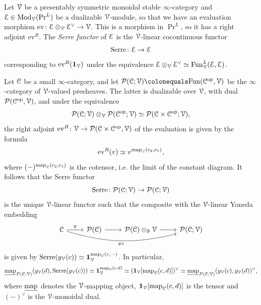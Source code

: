\documentclass[oneside,a4paper]{amsart}
\begin{document}
\begin{recollection}
Let $\EuScript{V}$ be a presentably symmetric monoidal stable $\infty$-category and $\EuScript{E} \in \mathrm{Mod}_{\EuScript{V}}(\Pr^{L})$ be a dualizable $\EuScript{V}$-module, so that we have an evaluation morphism $\mathrm{ev} \colon \EuScript{E} \otimes_{\EuScript{V}} \EuScript{E}^{\vee} \rightarrow \EuScript{V}$. This is a morphism in $\Pr^L$, so it has a right adjoint $\mathrm{ev}^{R}$. The \emph{Serre functor} of $\EuScript{E}$ is the $\EuScript{V}$-linear cocontinuous functor
\[
\mathrm{Serre} \colon \EuScript{E} \rightarrow \EuScript{E}
\]
corresponding to $\mathrm{ev}^{R}(\mathbf{1}_{\EuScript{V}})$ under the equivalence $\EuScript{E} \otimes_{\EuScript{V}} \EuScript{E}^{\vee} \simeq \mathrm{Fun}^{L}_{\EuScript{V}}(\EuScript{E}, \EuScript{E})$.
\end{recollection}

\begin{example}
\label{example:serre_functor_of_a_v_linear_presheaf_infty_category}
Let $\EuScript{C}$ be a small $\infty$-category, and let $\presheaves(\ccat; \vcat) \colonequals \Fun(\ccat^{\op}, \vcat)$ be the $\infty$-category of $\EuScript{V}$-valued presheaves. The latter is dualizable over $\EuScript{V}$, with dual $\mathcal{P}(\EuScript{C}^{\mathrm{op}}, \EuScript{V})$, and under the equivalence
\[
\mathcal{P}(\EuScript{C}; \EuScript{V}) \otimes_{\EuScript{V}} \mathcal{P}(\EuScript{C}^{\mathrm{op}}; \EuScript{V}) \simeq \mathcal{P}(\EuScript{C} \times \EuScript{C}^{\mathrm{op}}; \EuScript{V}), 
\]
the right adjoint $\mathrm{ev}^{R} \colon \EuScript{V} \rightarrow \mathcal{P}(\EuScript{C} \times \EuScript{C}^{\mathrm{op}}, \EuScript{V})$ of the evaluation is given by the formula 
\[
\mathrm{ev}^{R}(v) \simeq v^{\textnormal{map}_{\EuScript{C}}(c_{2}, c_{1})}, 
\]
where $(-)^{\textnormal{map}_{\EuScript{C}}(c_{2}, c_{1})}$ is the cotensor, i.e. the limit of the constant diagram. It follows that the Serre functor 
\[
\mathrm{Serre} \colon \mathcal{P}(\EuScript{C}; \EuScript{V}) \rightarrow \mathcal{P}(\EuScript{C}; \EuScript{V}) 
\]
is the unique $\EuScript{V}$-linear functor such that the composite with the $\EuScript{V}$-linear Yoneda embedding 
\[
\begin{tikzcd}
	{\ccat} & {\presheaves(\ccat)} & {\presheaves(\ccat) \otimes_{\spaces} \vcat} & {\presheaves(\ccat; \vcat) }
	\arrow["y", from=1-1, to=1-2]
	\arrow["{y_{\vcat}}"', bend right=15, from=1-1, to=1-4]
	\arrow[from=1-2, to=1-3]
	\arrow[from=1-3, to=1-4]
\end{tikzcd}
\]
is given by $\mathrm{Serre}(y_{\EuScript{V}}(c)) \simeq \mathbf{1}_{\EuScript{V}}^{\textnormal{map}_{\EuScript{C}}(c, -)}$. In particular, 
\begin{equation}
\label{equation:formula_for_serre_of_v_presheaves}
\underline{\textnormal{map}}_{\mathcal{P}(\EuScript{C}; \EuScript{V})}(y_{\EuScript{V}}(d), \mathrm{Serre}(y_{\EuScript{V}}(c))) \simeq \mathbf{1}_{\EuScript{V}}^{\textnormal{map}_{\EuScript{C}}(c, d)} \simeq (\mathbf{1}_{\EuScript{V}}[\textnormal{map}_{\EuScript{C}}(c, d)])^{\vee} \simeq \underline{\textnormal{map}}_{\mathcal{P}(\EuScript{C}; \EuScript{V})}(y_{\EuScript{V}}(c), y_{\EuScript{V}}(d))^{\vee}, 
\end{equation}
where $\underline{\textnormal{map}}$ denotes the $\EuScript{V}$-mapping object, $\mathbf{1}_{\EuScript{V}}[\textnormal{map}_{\EuScript{C}}(c, d)]$ is the tensor and $(-)^{\vee}$ is the $\EuScript{V}$-monoidal dual. 
\end{example}
\end{document}
